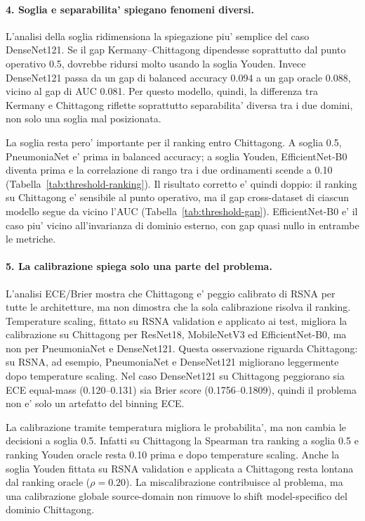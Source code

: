 \documentclass[11pt,a4paper]{article}
\newcommand{\balacc}{balanced accuracy}
\begin{document}
\paragraph{4. Soglia e separabilita' spiegano fenomeni diversi.}
L'analisi della soglia ridimensiona la spiegazione piu' semplice del caso
DenseNet121. Se il gap Kermany--Chittagong dipendesse soprattutto dal punto
operativo 0.5, dovrebbe ridursi molto usando la soglia Youden. Invece DenseNet121
passa da un gap di \balacc{} 0.094 a un gap oracle 0.088, vicino al gap di AUC
0.081. Per questo modello, quindi, la differenza tra Kermany e Chittagong
riflette soprattutto separabilita' diversa tra i due domini, non solo una soglia
mal posizionata.

La soglia resta pero' importante per il ranking entro Chittagong. A soglia 0.5,
PneumoniaNet e' prima in \balacc{}; a soglia Youden, EfficientNet-B0 diventa
prima e la correlazione di rango tra i due ordinamenti scende a 0.10
(Tabella~\ref{tab:threshold-ranking}). Il risultato corretto e' quindi doppio:
il ranking su Chittagong e' sensibile al punto operativo, ma il gap
cross-dataset di ciascun modello segue da vicino l'AUC
(Tabella~\ref{tab:threshold-gap}). EfficientNet-B0 e' il caso piu' vicino
all'invarianza di dominio esterno, con gap quasi nullo in entrambe le metriche.

\paragraph{5. La calibrazione spiega solo una parte del problema.}
L'analisi ECE/Brier mostra che Chittagong e' peggio calibrato di RSNA per tutte
le architetture, ma non dimostra che la sola calibrazione risolva il ranking.
Temperature scaling, fittato su RSNA validation e applicato ai test, migliora la
calibrazione su Chittagong per ResNet18, MobileNetV3 ed EfficientNet-B0, ma non
per PneumoniaNet e DenseNet121. Questa osservazione riguarda Chittagong: su
RSNA, ad esempio, PneumoniaNet e DenseNet121 migliorano leggermente dopo
temperature scaling. Nel caso DenseNet121 su Chittagong peggiorano sia ECE
equal-mass (0.120--0.131) sia Brier score (0.1756--0.1809), quindi il problema
non e' solo un artefatto del binning ECE.

La calibrazione tramite temperatura migliora le probabilita', ma non cambia le
decisioni a soglia 0.5. Infatti su Chittagong la Spearman tra ranking a soglia
0.5 e ranking Youden oracle resta 0.10 prima e dopo temperature scaling. Anche
la soglia Youden fittata su RSNA validation e applicata a Chittagong resta
lontana dal ranking oracle (\(\rho=0.20\)). La miscalibrazione contribuisce al
problema, ma una calibrazione globale source-domain non rimuove lo shift
model-specifico del dominio Chittagong.
\end{document}
